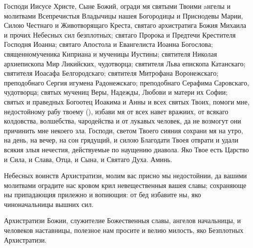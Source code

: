 \begin{mymulticols}

Господи Иисусе Христе, Сыне Божий, огради мя святыми Твоими aнгелы и молитвами Всепречистыя Владычицы нашея Богородицы и Приснодевы Марии, Силою Честнаго и Животворящаго Креста, святаго архистратига Божия Михаила и прочих Небесных сил безплотных; святаго Пророка и Предтечи Крестителя Господня Иоанна; святаго Апостола и Евангелиста Иоанна Богослова; священномученика Киприана и мученицы Иустины; святителя Николая архиепископа Мир Ликийских, чудотворца; святителя Льва епископа Катанскаго; святителя Иоасафа Белгородскаго; святителя Митрофана Воронежскаго; преподобнаго Сергия игумена Радонежскаго; преподобнаго Серафима Саровскаго,  чудотворца; святых мучениц Веры, Надежды, Любови и матери их Софии; святых и праведных Богоотец Иоакима и Анны и всех святых Твоих, помоги мне, недостойному рабу твоему (), избави мя от всех навет вражиих, от всякаго колдовства, волшебства, чародейства и от лукавых человек, да не возмогут они причинить мне некоего зла. Господи, светом Твоего сияния сохрани мя на утро, на день, на вечер, на сон грядущий, и силою Благодати Твоея отврати и удали всякия злыя нечестия, действуемые по наущению диавола. Яко Твое есть Царство и Сила, и Слава, Отца, и Сына, и Святаго Духа. Аминь.

\end{mymulticols}

\mychapterending



\tolkopoblagosloveniyu

\begin{mymulticols}



Небесных воинств Архистратизи, молим вас присно мы недостойнии, да вашими молитвами оградите нас кровом крил невещественныя вашея славы; сохраняюще ны припадающия прилежно и вопиющия: от бед избавите ны, яко чиноначальницы вышних сил.




Архистратизи Божии, служителие Божественныя славы, ангелов начальницы, и человеков наставницы, полезное нам просите и велию милость, яко Безплотных Архистратизи.

\end{mymulticols}

\mychapterending




